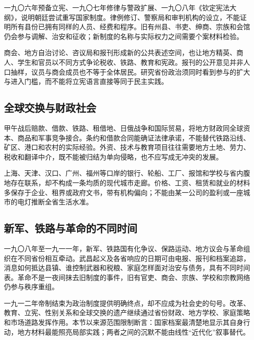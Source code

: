 一九〇六年预备立宪、一九〇七年修律与警政扩展、一九〇八年《钦定宪法大纲》，说明朝廷尝试重写国家制度。律例修订、警察局和审判机构的设立，不能证明所有县份已拥有同样的人员、经费和程序。旧有州县、书吏、绅商、宗族和会馆仍会参与调解、治安和征收；新制度的名称与实际权力之间需要个案材料检验。

商会、地方自治讨论、咨议局和报刊形成新的公共表述空间，也让地方精英、商人、学生和官员以不同方式争论税收、铁路、教育和宪政。报刊的公开意见并非人口抽样，议员与商会成员也不等于全体居民。研究省份政治须同时看到参与的扩大与进入门槛，而不能将立宪语言直接等同于民主实践。

\subsection{全球交换与财政社会}

甲午战后赔款、借款、铁路、租借地、日俄战争和国际贸易，将地方财政同全球资本、商品和军事竞争接合。条约和借款合同能确证法律承诺，不能替代铁路沿线、矿区、港口和农村的实际经验。外资、技术与教育项目往往需要地方土地、劳力、税收和翻译中介，既不能被归结为单向侵略，也不应写成无冲突的发展。

上海、天津、汉口、广州、福州等口岸的银行、轮船、工厂、报馆和学校与省内腹地存在联系，却不构成一条均质的现代城市走廊。价格、工资、租赁和就业的材料多保存于企业、租界或政府文书，带有机构偏向；不能由某一公司的盈利或一座城市的电灯推断全省生活水准。

\subsection{新军、铁路与革命的不同时间}

一九〇八年至一九一一年，新军、铁路国有化争议、保路运动、地方议会与革命组织在不同省份相互牵动。武昌起义及各省响应的日期可由电报、报刊和档案追踪，消息如何抵达县镇、谁控制武器和税粮、家庭怎样面对治安与债务，具有不同时间表。革命不是一夜间抹去旧制度的事件，旧有官吏、商会、宗族、学校和宗教网络仍参与秩序重组。

一九一二年帝制结束为政治制度提供明确终点，却不应成为社会史的句号。改革、教育、立宪、性别关系和全球交换的遗产继续通过省份财政、地方学校、家庭策略和市场道路发挥作用。本节以来源范围限制断言：国家档案最清楚地显示其自身行动，地方材料最能照亮局部实践；两者之间的沉默不能由线性“近代化”叙事替代。

